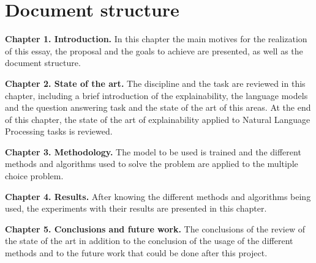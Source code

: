 \section{Document structure}
\label{sec:DocumentStructure}
\begin{description}
\item \textbf{Chapter 1. Introduction.} In this chapter the main motives for the realization of this essay, the proposal and the goals to achieve are presented, as well as the document structure.
\item \textbf{Chapter 2. State of the art.} The discipline and the task are reviewed in this chapter, including a brief introduction of the explainability, the language models and the question answering task and the state of the art of this areas. At the end of this chapter, the state of the art of explainability applied to Natural Language Processing tasks is reviewed.
\item \textbf{Chapter 3. Methodology.}  The model to be used is trained and the different methods and algorithms used to solve the problem are applied to the multiple choice problem.
\item \textbf{Chapter 4. Results.} After knowing the different methods and algorithms being used, the experiments with their results are presented in this chapter.
\item \textbf{Chapter 5. Conclusions and future work.} The conclusions of the review of the state of the art in addition to the conclusion of the usage of the different methods and to the future work that could be done after this project.
\end{description} 